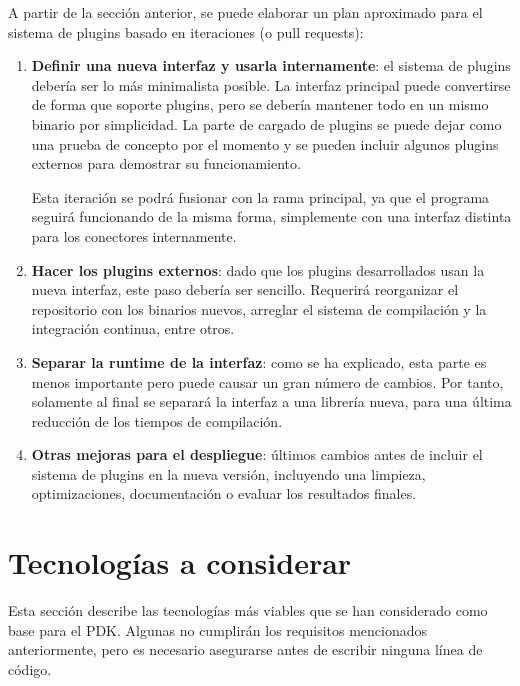 A partir de la sección anterior, se puede elaborar un plan aproximado para el
sistema de plugins basado en iteraciones (o pull requests):

\begin{enumerate}
    \item \textbf{Definir una nueva interfaz y usarla internamente}: el sistema
        de plugins debería ser lo más minimalista posible. La interfaz principal
        puede convertirse de forma que soporte plugins, pero se debería mantener
        todo en un mismo binario por simplicidad. La parte de cargado de plugins
        se puede dejar como una prueba de concepto por el momento y se pueden
        incluir algunos plugins externos para demostrar su funcionamiento.

        Esta iteración se podrá fusionar con la rama principal, ya que el
        programa seguirá funcionando de la misma forma, simplemente con una
        interfaz distinta para los conectores internamente.

    \item \textbf{Hacer los plugins externos}: dado que los plugins
        desarrollados usan la nueva interfaz, este paso debería ser sencillo.
        Requerirá reorganizar el repositorio con los binarios nuevos, arreglar
        el sistema de compilación y la integración continua, entre otros.

    \item \textbf{Separar la runtime de la interfaz}: como se ha explicado, esta
        parte es menos importante pero puede causar un gran número de cambios.
        Por tanto, solamente al final se separará la interfaz a una librería
         nueva, para una última reducción de los tiempos de
        compilación.

    \item \textbf{Otras mejoras para el despliegue}: últimos cambios antes de
        incluir el sistema de plugins en la nueva versión, incluyendo una
        limpieza, optimizaciones, documentación o evaluar los resultados
        finales.

\end{enumerate}

\section{Tecnologías a considerar}

Esta sección describe las tecnologías más viables que se han considerado como
base para el PDK. Algunas no cumplirán los requisitos mencionados anteriormente,
pero es necesario asegurarse antes de escribir ninguna línea de código.

